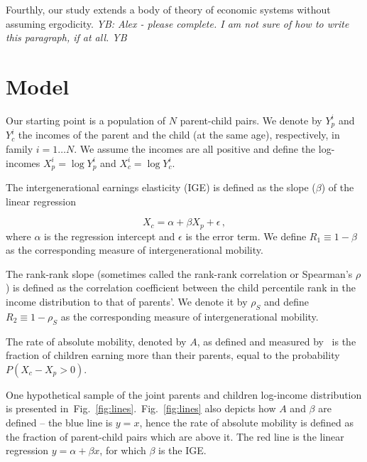 \documentclass[12pt]{article}
\newcommand{\YB}[1]{{\it YB: #1 YB}}
\newcommand{\fref}[1]{Fig.~\ref{fig:#1}}
\newcommand{\be}{\begin{equation}}
\newcommand{\ee}{\end{equation}}
\numberwithin{equation}{section}
\begin{document}
Fourthly, our study extends a body of theory of economic systems without assuming ergodicity. \YB{Alex - please complete. I am not sure of how to write this paragraph, if at all.}

\section{Model}

Our starting point is a population of $N$ parent-child pairs. We denote by $Y_p^i$ and $Y_c^i$ the incomes of the parent and the child (at the same age), respectively, in family $i=1\dots N$. We assume the incomes are all positive and define the log-incomes $X_p^i=\log Y_p^i$ and $X_c^i=\log Y_c^i$.

The intergenerational earnings elasticity (IGE) is defined as the slope ($\beta$) of the linear regression

\be
X_c = \alpha + \beta X_p + \epsilon\,,
\ee
where $\alpha$ is the regression intercept and $\epsilon$ is the error term. We define $R_1\equiv 1- \beta$ as the corresponding measure of intergenerational mobility.

The rank-rank slope (sometimes called the rank-rank correlation or Spearman's $\rho$) is defined as the correlation coefficient between the child percentile rank in the income distribution to that of parents'. We denote it by $\rho_S$ and define $R_2\equiv 1- \rho_S$ as the corresponding measure of intergenerational mobility.

The rate of absolute mobility, denoted by $A$, as defined and measured by~\citet{chetty2017fading} is the fraction of children earning more than their parents, equal to the probability $P\left(X_c-X_p > 0\right)$.

One hypothetical sample of the joint parents and children log-income distribution is presented in~\fref{lines}.~\fref{lines} also depicts how $A$ and $\beta$ are defined -- the blue line is $y=x$, hence the rate of absolute mobility is defined as the fraction of parent-child pairs which are above it. The red line is the linear regression $y=\alpha +\beta x$, for which $\beta$ is the IGE.
\end{document}
